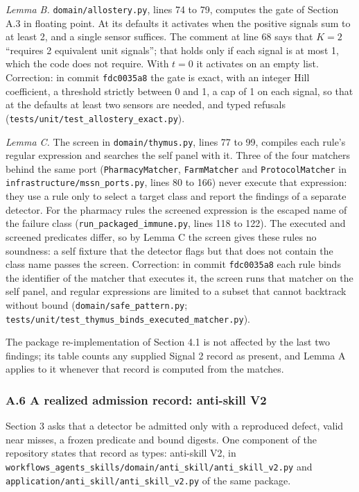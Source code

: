 \documentclass[
  11pt,
]{article}
\newcommand{\passthrough}[1]{#1}
\begin{document}
\emph{Lemma B.} \nolinkurl{domain/allostery.py}, lines 74 to 79,
computes the gate of Section A.3 in floating point. At its defaults it
activates when the positive signals sum to at least 2, and a single
sensor suffices. The comment at line 68 says that \(K = 2\) ``requires 2
equivalent unit signals''; that holds only if each signal is at most 1,
which the code does not require. With \(t = 0\) it activates on an empty
list. Correction: in commit \passthrough{\lstinline!fdc0035a8!} the gate
is exact, with an integer Hill coefficient, a threshold strictly between
0 and 1, a cap of 1 on each signal, so that at the defaults at least two
sensors are needed, and typed refusals
(\nolinkurl{tests/unit/test_allostery_exact.py}).

\emph{Lemma C.} The screen in \nolinkurl{domain/thymus.py}, lines 77 to
99, compiles each rule's regular expression and searches the self panel
with it. Three of the four matchers behind the same port
(\nolinkurl{PharmacyMatcher}, \passthrough{\lstinline!FarmMatcher!} and
\nolinkurl{ProtocolMatcher} in \nolinkurl{infrastructure/mssn_ports.py},
lines 80 to 166) never execute that expression: they use a rule only to
select a target class and report the findings of a separate detector.
For the pharmacy rules the screened expression is the escaped name of
the failure class (\nolinkurl{run_packaged_immune.py}, lines 118 to
122). The executed and screened predicates differ, so by Lemma C the
screen gives these rules no soundness: a self fixture that the detector
flags but that does not contain the class name passes the screen.
Correction: in commit \passthrough{\lstinline!fdc0035a8!} each rule
binds the identifier of the matcher that executes it, the screen runs
that matcher on the self panel, and regular expressions are limited to a
subset that cannot backtrack without bound
(\nolinkurl{domain/safe_pattern.py};
\nolinkurl{tests/unit/test_thymus_binds_executed_matcher.py}).

The package re-implementation of Section 4.1 is not affected by the last
two findings; its table counts any supplied Signal 2 record as present,
and Lemma A applies to it whenever that record is computed from the
matches.

\subsubsection{A.6 A realized admission record: anti-skill
V2}\label{a.6-a-realized-admission-record-anti-skill-v2}

Section 3 asks that a detector be admitted only with a reproduced
defect, valid near misses, a frozen predicate and bound digests. One
component of the repository states that record as types: anti-skill V2,
in
\nolinkurl{workflows_agents_skills/domain/anti_skill/anti_skill_v2.py}
and \nolinkurl{application/anti_skill/anti_skill_v2.py} of the same
package.
\end{document}
